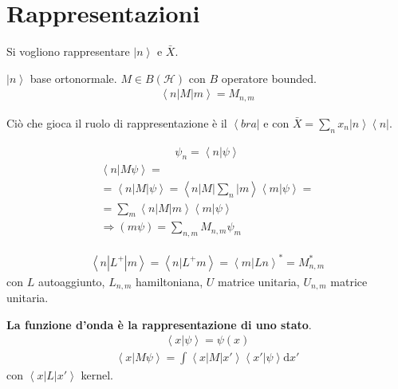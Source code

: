 \section{Rappresentazioni} %
Si vogliono rappresentare $\left |n \right\rangle$ e $\bar X$.

$\left |n \right\rangle$ base ortonormale. $M\in B\left(\mathcal{H}\right)$ con $B$ operatore bounded.
\begin{equation}\begin{split}
\left\langle n|M|m \right\rangle=M_{n,m}
\end{split}\end{equation}

Ciò che gioca il ruolo di rappresentazione è il $\left\langle bra\right |$ e con $\bar X=\sum_{n}{x_n\left |n \right\rangle\left\langle n\right |}$.

\begin{equation}\begin{split}
\psi _n=\left\langle n|\psi  \right\rangle
\end{split}\end{equation}
\begin{equation}\begin{split}
\left\langle n|M\psi  \right\rangle=\\
=\left\langle n|M|\psi  \right\rangle=\left\langle n|M|\sum_{n}|m \right\rangle\left\langle m|\psi  \right\rangle=\\
=\sum_{m}\left\langle n|M|m \right\rangle\left\langle m|\psi  \right\rangle \\
\Longrightarrow \left(m\psi \right)=\sum_{n,m}{M_{n,m}\psi _m}
\end{split}\end{equation}

\begin{equation}\begin{split}
\left\langle n|L^+|m \right\rangle=\left\langle n|L^+m \right\rangle=\left\langle m|Ln \right\rangle^*=M^*_{n,m}
\end{split}\end{equation}
con $L$ autoaggiunto, $L_{n,m}$ hamiltoniana, $U$ matrice unitaria, $U_{n,m}$ matrice unitaria.

\textbf{La funzione d'onda è la rappresentazione di uno stato}.
\begin{equation}\begin{split}
\left\langle x|\psi  \right\rangle=\psi \left(x\right)
\end{split}\end{equation}
\begin{equation}\begin{split}
\left\langle x|M\psi  \right\rangle=\int{\left\langle x|M|x' \right\rangle\left\langle x'|\psi  \right\rangle \textrm{d}x'}
\end{split}\end{equation}
con $\left\langle x|L|x' \right\rangle$ kernel.

